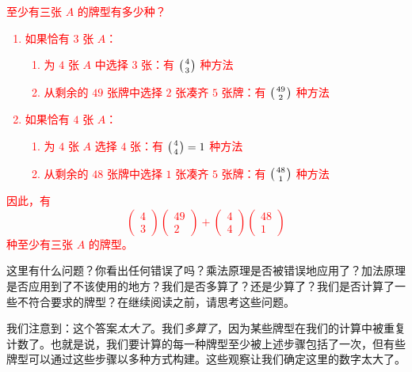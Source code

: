 \begin{example}[找出缺陷]

    \textcolor{red}{
        至少有三张 $A$ 的牌型有多少种？
        \begin{enumerate}[label=(\arabic*)]
            \item 如果恰有 $3$ 张 $A$：
                  \begin{enumerate}[label=(\alph*)]
                      \item 为 $4$ 张 $A$ 中选择 $3$ 张：有 $\big({4 \atop 3}\big)$ 种方法
                      \item 从剩余的 $49$ 张牌中选择 $2$ 张凑齐 $5$ 张牌：有 $\big({49 \atop 2}\big)$ 种方法
                  \end{enumerate}
            \item 如果恰有 $4$ 张 $A$：
                  \begin{enumerate}[label=(\alph*)]
                      \item 为 $4$ 张 $A$ 选择 $4$ 张：有 $\big({4 \atop 4}\big) = 1$ 种方法
                      \item 从剩余的 $48$ 张牌中选择 $1$ 张凑齐 $5$ 张牌：有 $\big({48 \atop 1}\big)$ 种方法
                  \end{enumerate}
        \end{enumerate}
        因此，有
        \[\begin{pmatrix}
                4 \\
                3
            \end{pmatrix}\begin{pmatrix}
                49 \\
                2
            \end{pmatrix}+\begin{pmatrix}
                4 \\
                4
            \end{pmatrix}\begin{pmatrix}
                48 \\
                1
            \end{pmatrix}\]
        种至少有三张 $A$ 的牌型。
    }

    这里有什么问题？你看出任何错误了吗？乘法原理是否被错误地应用了？加法原理是否应用到了不该使用的地方？我们是否多算了？还是少算了？我们是否计算了一些不符合要求的牌型？在继续阅读之前，请思考这些问题。

    我们注意到：这个答案\emph{太大了}。我们\emph{多算了}，因为某些牌型在我们的计算中被重复计数了。也就是说，我们要计算的每一种牌型至少被上述步骤包括了一次，但有些牌型可以通过这些步骤以多种方式构建。这些观察让我们确定这里的数字太大了。


\end{example}
